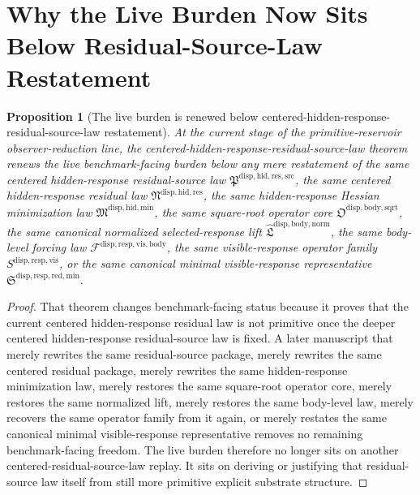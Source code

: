 \documentclass[11pt]{article}
\newcommand{\ResidualSourceLawPackage}{\mathfrak P^{\mathrm{disp,hid,res,src}}}
\newcommand{\ResidualLawPackage}{\mathfrak N^{\mathrm{disp,hid,res}}}
\newcommand{\HiddenMinimizationPackage}{\mathfrak M^{\mathrm{disp,hid,min}}}
\newcommand{\SquareRootOperatorCore}{\mathfrak O^{\mathrm{disp,body,sqrt}}}
\newcommand{\NormalizedLiftPackage}{\widehat{\mathfrak L}^{\mathrm{disp,body,norm}}}
\newcommand{\VisibleBodyForcingLaw}{\mathscr F^{\mathrm{disp,resp,vis,body}}}
\newcommand{\VisibleResponseOperator}{S^{\mathrm{disp,resp,vis}}}
\newcommand{\MinimalReducedStructure}{\mathfrak S^{\mathrm{disp,resp,red,min}}}
\newtheorem{proposition}{Proposition}
\begin{document}
\section{Why the Live Burden Now Sits Below Residual-Source-Law Restatement}

\begin{proposition}[The live burden is renewed below centered-hidden-response-residual-source-law restatement]
At the current stage of the primitive-reservoir observer-reduction line, the centered-hidden-response-residual-source-law theorem renews the live benchmark-facing burden below any mere restatement of the same centered hidden-response residual-source law \(\ResidualSourceLawPackage\), the same centered hidden-response residual law \(\ResidualLawPackage\), the same hidden-response Hessian minimization law \(\HiddenMinimizationPackage\), the same square-root operator core \(\SquareRootOperatorCore\), the same canonical normalized selected-response lift \(\NormalizedLiftPackage\), the same body-level forcing law \(\VisibleBodyForcingLaw\), the same visible-response operator family \(\VisibleResponseOperator\), or the same canonical minimal visible-response representative \(\MinimalReducedStructure\).
\end{proposition}

\begin{proof}
That theorem changes benchmark-facing status because it proves that the current centered hidden-response residual law is not primitive once the deeper centered hidden-response residual-source law is fixed. A later manuscript that merely rewrites the same residual-source package, merely rewrites the same centered residual package, merely rewrites the same hidden-response minimization law, merely restores the same square-root operator core, merely restores the same normalized lift, merely restores the same body-level law, merely recovers the same operator family from it again, or merely restates the same canonical minimal visible-response representative removes no remaining benchmark-facing freedom. The live burden therefore no longer sits on another centered-residual-source-law replay. It sits on deriving or justifying that residual-source law itself from still more primitive explicit substrate structure.
\end{proof}
\end{document}

